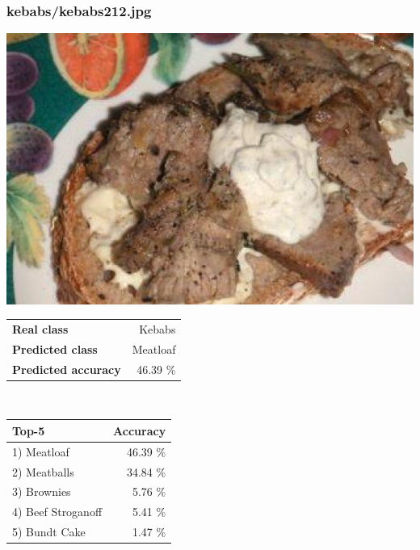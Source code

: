 \subsubsection{kebabs/kebabs212.jpg}

\begin{minipage}[t]{0.4\textwidth}
	\vspace{0pt}
	\includegraphics[width=\linewidth]{images/evaluation-images/kebabs/kebabs212.jpg}
\end{minipage}
\hfill
\begin{minipage}[t]{0.5\textwidth}
	\vspace{0pt}\raggedright
	\begin{tabularx}{\textwidth}{X r}
		\small \textbf{Real class} & \small Kebabs\\
		\small \textbf{Predicted class} & \small Meatloaf\\
		\small \textbf{Predicted accuracy} & \small 46.39 \%
    \end{tabularx}\\
    
    \vspace{6pt}
	\begin{tabularx}{\textwidth}{X r}
        \small \textbf{Top-5} & \small \textbf{Accuracy} \\
        \hline
		\small 1) Meatloaf & \small 46.39 \%\\\small 2) Meatballs & \small 34.84 \%\\\small 3) Brownies & \small 5.76 \%\\\small 4) Beef Stroganoff & \small 5.41 \%\\\small 5) Bundt Cake & \small 1.47 \%
    \end{tabularx}
\end{minipage}
    
